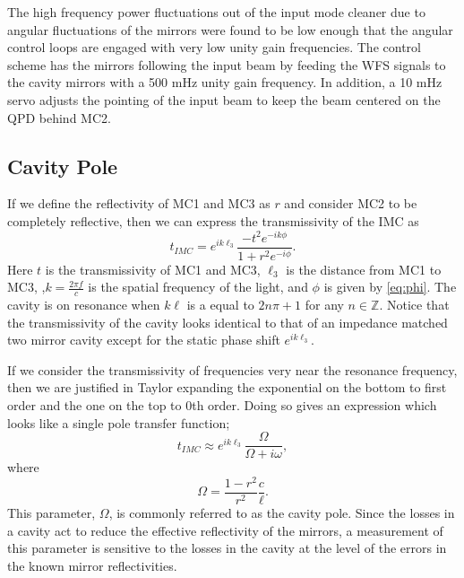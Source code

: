 The high frequency power fluctuations out of the input mode cleaner due to angular fluctuations 
of the mirrors were found to be low enough that the angular control loops are engaged with 
very low unity gain frequencies.  
The control scheme has the mirrors following the input beam by feeding the WFS signals to 
the cavity  mirrors with a 500 mHz unity gain frequency.  
In addition, a 10 mHz servo adjusts the pointing of the input beam to keep the beam 
centered on the QPD behind MC2.


\subsection{Cavity Pole}
\label{sec:cavity_pole}

If we define the reflectivity of MC1 and MC3 as $r$ and consider MC2 to be completely reflective, 
then we can express the transmissivity of the IMC as
\begin{equation}
	t_{IMC}=e^{ik\ell_3}\frac{-t^2e^{-ik\phi}}{1+r^2e^{-i\phi}}.
\end{equation}
Here $t$ is the transmissivity of MC1 and MC3, $\ell_3$ is the distance from MC1 to MC3, 
,$k=\tfrac{2\pi f}{c}$ is the spatial frequency of the light, and 
$\phi$ is given by \eqref{eq:phi}.
The cavity is on resonance when $k\ell$ is a equal to $2n\pi+1$ for any $n\in\mathbb{Z}$.  
Notice that the transmissivity of the cavity looks identical to that of an impedance matched 
two mirror cavity except for the static phase shift $e^{ik\ell_3}$.  

If we consider the transmissivity of frequencies very near the resonance frequency, 
then we are justified in Taylor expanding the exponential on the bottom to first order 
and the one on the top to 0th order.
Doing so gives an expression which looks like a single pole transfer function;
\begin{equation}
	t_{IMC}\approx e^{ik\ell_3}\frac{\Omega}{\Omega+i\omega},
	\label{eq:PoleApx}
\end{equation}
where
\begin{equation}
	\Omega=\frac{1-r^2}{r^2}\frac{c}{\ell}.
\end{equation}
This parameter, $\Omega$, is commonly referred to as the cavity pole.  
Since the losses in a cavity act to reduce the effective reflectivity of the mirrors, 
a measurement of this parameter is sensitive to the losses in the cavity at the level 
of the errors in the known mirror reflectivities.

